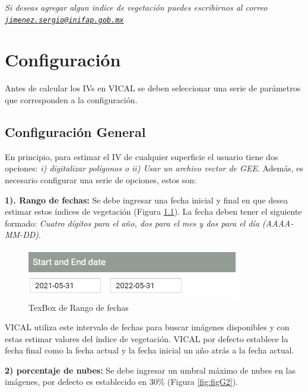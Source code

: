 \documentclass[
]{book}
\begin{document}
\emph{Si deseas agregar algun indice de vegetación puedes escribirnos al correo \href{mailto:jimenez.sergio@inifap.gob.mx}{\nolinkurl{jimenez.sergio@inifap.gob.mx}}}

\hypertarget{configuraciuxf3n}{%
\chapter{Configuración}\label{configuraciuxf3n}}

Antes de calcular los IVs en VICAL se deben seleccionar una serie de parámetros que corresponden a la configuración.

\hypertarget{configuraciuxf3n-general}{%
\section{Configuración General}\label{configuraciuxf3n-general}}

En principio, para estimar el IV de cualquier superficie el usuario tiene dos opciones: \emph{i) digitalizar polígonos o ii) Usar un archivo vector de GEE}. Además, es necesario configurar una serie de opciones, estos son:

\textbf{1). Rango de fechas: } Se debe ingresar una fecha inicial y final en que desea estimar estos índices de vegetación (Figura \ref{fig:figG1}). La fecha deben tener el siguiente formado: \emph{Cuatro dígitos para el año, dos para el mes y dos para el día (AAAA-MM-DD)}.

\begin{figure}

{\centering \includegraphics{./images/Figure1} 

}

\caption{TexBox de Rango de fechas}\label{fig:figG1}
\end{figure}

VICAL utiliza este intervalo de fechas para buscar imágenes disponibles y con estas estimar valores del índice de vegetación. VICAL por defecto establece la fecha final como la fecha actual y la fecha inicial un año atrás a la fecha actual.

\textbf{2) porcentaje de nubes: } Se debe ingresar un umbral máximo de nubes en las imágenes, por defecto es establecido en 30\% (Figura \ref{fig:figG2}).
\end{document}
